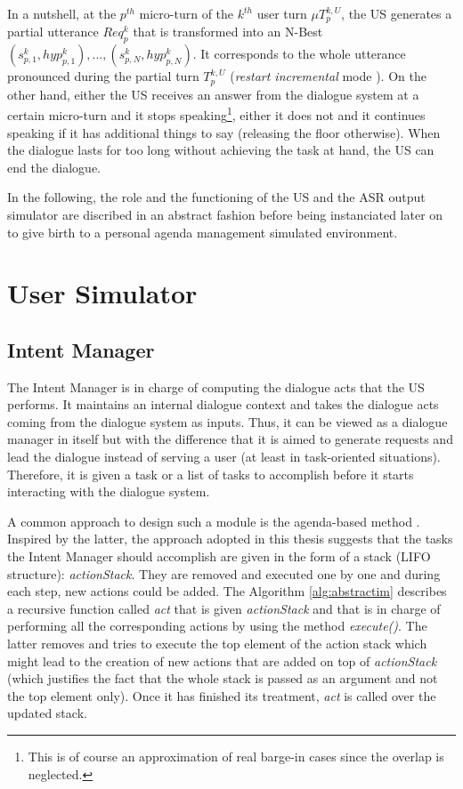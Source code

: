 				In a nutshell, at the $p^{th}$ micro-turn of the $k^{th}$ user turn $\mu T^{k,U}_p$, the US generates a partial utterance $Req^k_p$ that is transformed into an N-Best ${(s^k_{p,1}, hyp^k_{p,1}),...,(s^k_{p,N}, hyp^k_{p,N})}$. It corresponds to the whole utterance pronounced during the partial turn $T^{k,U}_p$ (\textit{restart incremental} mode \cite{Schlangen2011}). On the other hand, either the US receives an answer from the dialogue system at a certain micro-turn and it stops speaking\footnote{This is of course an approximation of real barge-in cases since the overlap is neglected.}, either it does not and it continues speaking if it has additional things to say (releasing the floor otherwise). When the dialogue lasts for too long without achieving the task at hand, the US can end the dialogue.

                                In the following, the role and the functioning of the US and the ASR output simulator are discribed in an abstract fashion before being instanciated later on to give birth to a personal agenda management simulated environment.
    
\section{User Simulator}

    \subsection{Intent Manager}
    \label{subsec:intentmanager}

        The Intent Manager is in charge of computing the dialogue acts that the US performs. It maintains an internal dialogue context and takes the dialogue acts coming from the dialogue system as inputs. Thus, it can be viewed as a dialogue manager in itself but with the difference that it is aimed to generate requests and lead the dialogue instead of serving a user (at least in task-oriented situations). Therefore, it is given a task or a list of tasks to accomplish before it starts interacting with the dialogue system.

        A common approach to design such a module is the agenda-based method \cite{Wei1999,Schatzmann2007}. Inspired by the latter, the approach adopted in this thesis suggests that the tasks the Intent Manager should accomplish are given in the form of a stack (LIFO structure): \textit{actionStack}. They are removed and executed one by one and during each step, new actions could be added. The Algorithm \ref{alg:abstractim} describes a recursive function called \textit{act} that is given \textit{actionStack} and that is in charge of performing all the corresponding actions by using the method \textit{execute()}. The latter removes and tries to execute the top element of the action stack which might lead to the creation of new actions that are added on top of \textit{actionStack} (which justifies the fact that the whole stack is passed as an argument and not the top element only). Once it has finished its treatment, \textit{act} is called over the updated stack.

